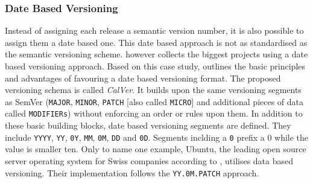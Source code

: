 \subsubsection{Date Based Versioning}%
\label{ssub:Date_Based_Versioning}
Instead of assigning each release a semantic version number, it is also
possible to assign them a date based one. This date based approach is not as
standardised as the semantic versioning scheme.
\autocite{HashemiCalendarVersioning2017} however collects the biggest projects
using a date based versioning approach. Based on this case study,
\autocite{HashemiCalendarVersioning2017} outlines the basic principles and
advantages of favouring a date based versioning format. The proposed versioning
schema is called \textit{CalVer}. It builds upon the same versioning segments
as SemVer (\texttt{MAJOR}, \texttt{MINOR}, \texttt{PATCH} [also called
\texttt{MICRO}] and additional pieces of data called \texttt{MODIFIERs})
without enforcing an order or rules upon them. In addition to these basic
building blocks, date based versioning segments are defined. They include
\texttt{YYYY}, \texttt{YY}, \texttt{0Y}, \texttt{MM}, \texttt{0M}, \texttt{DD}
and \texttt{0D}. Segments inclding a \texttt{0} prefix a 0 while the value is
smaller ten. Only to name one example, Ubuntu, the leading open source server
operating system for Swiss companies according to
\autocite{SwissICTWelcheOpenSource2018}, utilises data based versioning. Their
implementation follows the \texttt{YY.0M.PATCH} approach.

